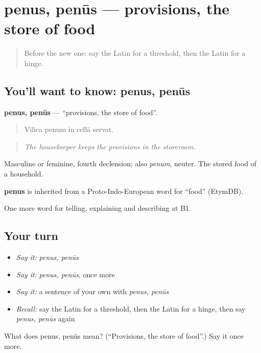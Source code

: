 \section[penus, penūs]{penus, penūs — provisions, the store of food}

\label{lesson:LA-C553-penus}



\begin{quote}
Before the new one: say the Latin for a threshold, then the Latin for a hinge.
\end{quote}

\subsection*{You'll want to know: penus, penūs}
\textbf{penus, penūs} — \textquotedblleft{}provisions, the store of food\textquotedblright{}.

\begin{quote}
Vīlica penum in cellā servat.
\end{quote}

\begin{quote}
\emph{The housekeeper keeps the provisions in the storeroom.}
\end{quote}

Masculine or feminine, fourth declension; also \emph{penum}, neuter. The stored food of a household.

\begin{cousinweb}
\textbf{penus} is inherited from a Proto-Indo-European word for \textquotedblleft{}food\textquotedblright{} (EtymDB).
\end{cousinweb}

\begin{grammarlens}[title={What you've built}]
One more word for telling, explaining and describing at B1.
\end{grammarlens}

\subsection*{Your turn}
\begin{itemize}
\raggedright
  \item \emph{Say it:} \emph{penus, penūs}
  \item \emph{Say it:} \emph{penus, penūs}, once more
  \item \emph{Say it:} a sentence of your own with \emph{penus, penūs}
  \item \emph{Recall:} say the Latin for a threshold, then the Latin for a hinge, then say \emph{penus, penūs} again
\end{itemize}

\begin{tcolorbox}[breakable,colback=teal!4,colframe=teal!35!black,title={Before you move on}]
What does penus, penūs mean? (\textquotedblleft{}Provisions, the store of food\textquotedblright{}.) Say it once more.
\end{tcolorbox}
